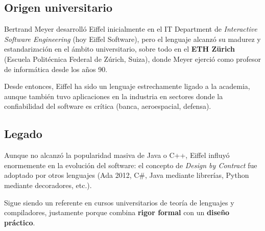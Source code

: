 \documentclass[a4paper,12pt]{article}
\begin{document}
\subsection{Origen universitario}

Bertrand Meyer desarrolló Eiffel inicialmente en el IT Department de
\textit{Interactive Software Engineering} (hoy Eiffel Software), pero el
lenguaje alcanzó su madurez y estandarización en el ámbito universitario, sobre
todo en el \textbf{ETH Zürich} (Escuela Politécnica Federal de Zúrich, Suiza),
donde Meyer ejerció como profesor de informática desde los años 90.

\noindent
Desde entonces, Eiffel ha sido un lenguaje estrechamente ligado a la academia,
aunque también tuvo aplicaciones en la industria en sectores donde la
confiabilidad del software es crítica (banca, aeroespacial, defensa).

\subsection{Legado}

Aunque no alcanzó la popularidad masiva de Java o C++, Eiffel influyó
enormemente en la evolución del software: el concepto de \textit{Design by
    Contract} fue adoptado por otros lenguajes (Ada 2012, C\#, Java mediante
librerías, Python mediante decoradores, etc.).

\noindent
Sigue siendo un referente en cursos universitarios de teoría de lenguajes y
compiladores, justamente porque combina \textbf{rigor formal} con un
\textbf{diseño práctico}.
\end{document}

